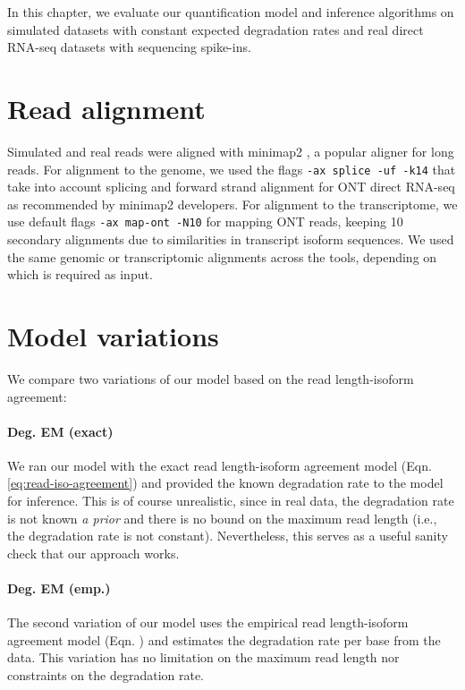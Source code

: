 
In this chapter, we evaluate our quantification model and inference algorithms on simulated datasets with constant expected degradation rates and real direct RNA-seq datasets with sequencing spike-ins. 

\section{Read alignment}

Simulated and real reads were aligned with minimap2 \cite{Minimap2018, Minimap2021}, a popular aligner for long reads. For alignment to the genome, we used the flags \texttt{-ax splice -uf -k14} that take into account splicing and forward strand alignment for ONT direct RNA-seq as recommended by minimap2 developers. For alignment to the transcriptome, we use default flags \texttt{-ax map-ont -N10} for mapping ONT reads, keeping 10 secondary alignments due to similarities in transcript isoform sequences. We used the same genomic or transcriptomic alignments across the tools, depending on which is required as input.   

\section{Model variations}

We compare two variations of our model based on the read length-isoform agreement:

\paragraph{Deg. EM (exact)} We ran our model with the exact read length-isoform agreement model (Eqn. \ref{eq:read-iso-agreement}) and provided the known degradation rate to the model for inference. This is of course unrealistic, since in real data, the degradation rate is not known \textit{a prior} and there is no bound on the maximum read length (i.e., the degradation rate is not constant). Nevertheless, this serves as a useful sanity check that our approach works. 

\paragraph{Deg. EM (emp.)} The second variation of our model uses the empirical read length-isoform agreement model (Eqn. ) and estimates the degradation rate per base from the data. This variation has no limitation on the maximum read length nor constraints on the degradation rate. 

